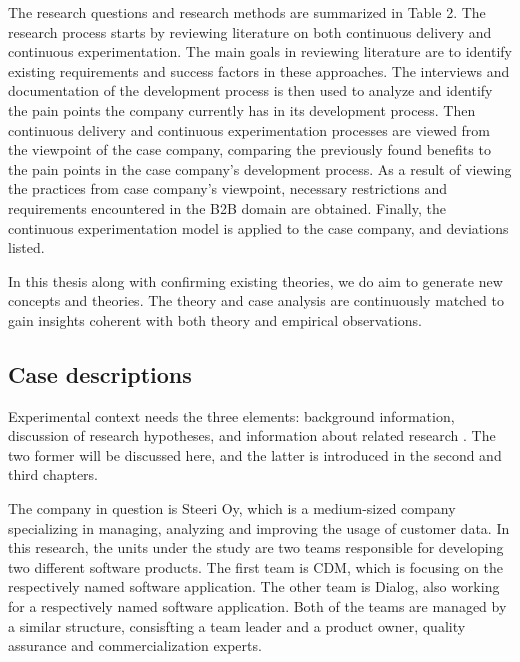 \documentclass[english, grading]{tktltiki2}
\theoremstyle{definition}
\theoremstyle{remark}
\begin{document}
The research questions and research methods are summarized in Table 2. The research process starts by reviewing literature on both continuous delivery and continuous experimentation. The main goals in reviewing literature are to identify existing requirements and success factors in these approaches. The interviews and documentation of the development process is then used to analyze and identify the pain points the company currently has in its development process. Then continuous delivery and continuous experimentation processes are viewed from the viewpoint of the case company, comparing the previously found benefits to the pain points in the case company's development process. As a result of viewing the practices from case company's viewpoint, necessary restrictions and requirements encountered in the B2B domain are obtained. Finally, the continuous experimentation model \cite{fagerholm2014building} is applied to the case company, and deviations listed. 

In this thesis along with confirming existing theories, we do aim to generate new concepts and theories. The theory and case analysis are continuously matched to gain insights coherent with both theory and empirical observations.

\subsection{Case descriptions} %

Experimental context needs the three elements: background information, discussion of research hypotheses, and information about related research \cite{kitchenham2002preliminary}. The two former will be discussed here, and the latter is introduced in the second and third chapters.


The company in question is Steeri Oy, which is a medium-sized company specializing in managing, analyzing and improving the usage of customer data. In this research, the units under the study are two teams responsible for developing two different software products. The first team is CDM, which is focusing on the respectively named software application. The other team is Dialog, also working for a respectively named software application. Both of the teams are managed by a similar structure, consisfting a team leader and a product owner, quality assurance and commercialization experts. 
\end{document}
